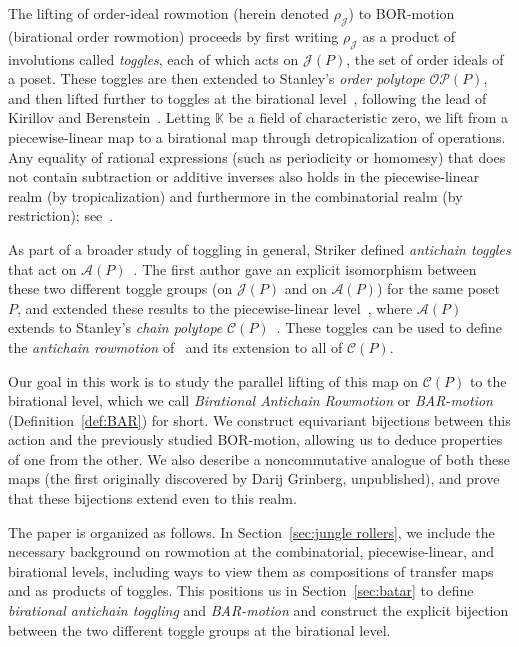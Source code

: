 \documentclass[10pt]{amsart}
\theoremstyle{definition}
\newcommand{\eg}{e.g.}
\newcommand{\kk}{\mathbb{K}}
\newcommand{\cala}{\mathcal{A}}
\newcommand{\calc}{\mathcal{C}}
\newcommand{\calj}{\mathcal{J}}
\newcommand{\calo}{\mathcal{O}}
\newcommand{\calp}{\mathcal{P}}
\newcommand\rowm{\rho}
\newcommand\rowJ{\rowm_{\mathcal{J}}}
\begin{document}
The lifting of order-ideal rowmotion (herein denoted $\rowJ$) to BOR-motion (birational order rowmotion) proceeds by first writing $\rowJ$ as a product of
involutions called \textit{toggles}, each of which acts on $\calj(P)$, the set of order ideals of a
poset. These toggles are then extended to Stanley's \textit{order polytope} $\calo\calp(P)$,
and then lifted further to toggles at
the birational level~\cite{einpropp}, following the lead of Kirillov and Berenstein~\cite{berenstein}.
Letting $\kk$ be a field of characteristic zero, we lift from a piecewise-linear map to a birational map through detropicalization of operations.
Any equality of rational expressions (such as periodicity or
homomesy) that does not contain subtraction or
additive inverses 
also holds in the piecewise-linear realm (by tropicalization) and furthermore in the
combinatorial realm (by restriction); see~\cite[Remark~10]{GrRo16}.

As part of a broader study of toggling in general, Striker defined \emph{antichain toggles}
that act on $\cala (P)$~\cite{strikergentog}. The first
author gave an explicit isomorphism between these two different toggle groups (on $\calj (P)$
and on $\cala(P)$) for the same
poset $P$, and extended these results to the piecewise-linear level~\cite{antichain-toggling}, 
where $\cala (P)$
extends to Stanley's \emph{chain polytope} $\calc (P)$~\cite{Sta86}. These toggles can be
used to define the \emph{antichain rowmotion} of~\cite{brouwer1974period} and its extension
to all of $\calc (P)$.

Our goal in this work is to study the parallel lifting of this map on $\calc (P)$ to the
birational level, which we call \emph{Birational Antichain Rowmotion} or \emph{BAR-motion}
(Definition~\ref{def:BAR}) for short. We construct equivariant bijections between this
action and the previously studied BOR-motion, allowing us to deduce properties of one from
the other. We also describe a noncommutative analogue of both these maps (the first
originally discovered by Darij Grinberg, unpublished), and prove that these bijections
extend even to this realm.

The paper is organized as follows. In Section~\ref{sec:jungle rollers}, we include the
necessary background on rowmotion at the combinatorial, piecewise-linear, and birational
levels, including ways to view them as compositions of transfer maps and as products of
toggles. This positions us in Section~\ref{sec:batar} to define \textit{birational
antichain toggling} and \textit{BAR-motion} and construct the explicit bijection between the
two different toggle groups at the birational level. 
\end{document}
